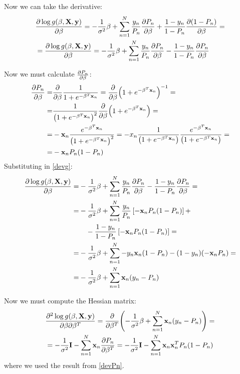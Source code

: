 Now we can take the derivative:
\begin{equation}
\label{devg}
\begin{aligned}
&\frac{\partial \log g(\mathbf{\beta},\mathrm{\mathbf{X}},\mathbf{y})}{\partial \mathbf{\beta}} = - \frac{1}{\sigma^2} \mathbf{\beta} + \sum_{n=1}^N \frac{y_n}{P_n}\frac{\partial P_n}{\partial \mathbf{\beta}} + \frac{1-y_n}{1-P_n}\frac{\partial (1-P_n)}{\partial \mathbf{\beta}} =\\
&=\frac{\partial \log g(\mathbf{\beta},\mathrm{\mathbf{X}},\mathbf{y})}{\partial \mathbf{\beta}} = - \frac{1}{\sigma^2} \mathbf{\beta} + \sum_{n=1}^N \frac{y_n}{P_n}\frac{\partial P_n}{\partial \mathbf{\beta}} - \frac{1-y_n}{1-P_n}\frac{\partial P_n}{\partial \mathbf{\beta}}
\end{aligned}
\end{equation}

Now we must calculate $\frac{\partial P_n}{\partial \mathbf{\beta}}$:
\begin{equation}
\label{devPn}
\begin{aligned}
\frac{\partial P_n}{\partial \be} =& \frac{\partial}{\partial \be} \frac{1}{1+e^{-\be^T\x_n}} = \frac{\partial}{\partial \be} \br{1+e^{-\be^T\x_n}}^{-1} =\\
=& \frac{1}{\br{1+e^{-\be^T\x_n}}^2}  \frac{\partial}{\partial \be} \br{1+e^{-\be^T\x_n}} = \\
=&  -\x_n \frac{e^{-\be^T\x_n}}{\br{1+e^{-\be^T\x_n}}^2}   = -x_n \frac{1}{\br{1+e^{-\be^T\x_n}}}\frac{e^{-\be^T\x_n}}{\br{1+e^{-\be^T\x_n}}} =\\
=& -\x_nP_n \br{1-P_n}
\end{aligned}
\end{equation}
Substituting in \autoref{devg}:
\begin{equation}
\begin{aligned}
\frac{\partial \log g(\be,\X,\y)}{\partial \be} =&  - \frac{1}{\sigma^2} \be + \sum_{n=1}^N \frac{y_n}{P_n}\frac{\partial P_n}{\partial \be} - \frac{1-y_n}{1-P_n}\frac{\partial P_n}{\partial \be} =\\
=&- \frac{1}{\sigma^2} \be + \sum_{n=1}^N \frac{y_n}{P_n}\left[-\x_nP_n \br{1-P_n}\right]+ \\
&\quad  - \frac{1-y_n}{1-P_n}\left[-\x_nP_n \br{1-P_n}\right] =\\
=& - \frac{1}{\sigma^2} \be + \sum_{n=1}^N -y_n\x_n \br{1-P_n} - (1-y_n)(-\x_nP_n ) = \\
=& - \frac{1}{\sigma^2} \be + \sum_{n=1}^N \x_n (y_n-P_n)
\end{aligned}
\end{equation}

Now we must compute the Hessian matrix:
\begin{equation}
\begin{aligned}
&\frac{\partial^2 \log g(\be,\X,\y)}{\partial \be \partial\be^T}  = \frac{\partial}{\partial \be^T} \br{- \frac{1}{\sigma^2} \be + \sum_{n=1}^N \x_n (y_n-P_n)} =
\\ &=- \frac{1}{\sigma^2} \I -\sum_{n=1}^N \x_n \frac{\partial P_n}{\partial \be^T} = - \frac{1}{\sigma^2} \I - \sum_{n=1}^N \x_n \x_n^TP_n \br{1-P_n}
\end{aligned}
\end{equation}
where we used the result from \autoref{devPn}.

